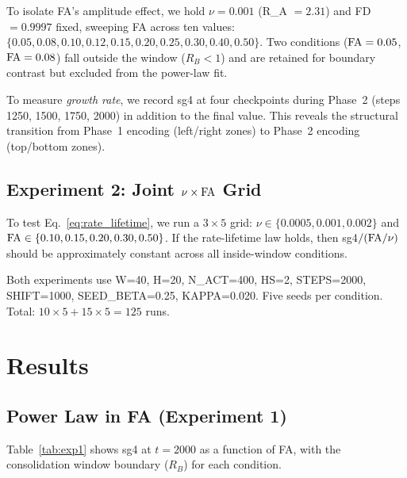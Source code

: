 \documentclass[11pt]{article}
\begin{document}
To isolate FA's amplitude effect, we hold $\nu = 0.001$ (R\_A $= 2.31$)
and FD $= 0.9997$ fixed, sweeping FA across ten values:
$\{0.05, 0.08, 0.10, 0.12, 0.15, 0.20, 0.25, 0.30, 0.40, 0.50\}$.
Two conditions (${\rm FA} = 0.05$, ${\rm FA} = 0.08$) fall outside the
window ($R_B < 1$) and are retained for boundary contrast but excluded from
the power-law fit.

To measure \emph{growth rate}, we record sg4 at four checkpoints during
Phase~2 (steps 1250, 1500, 1750, 2000) in addition to the final value.
This reveals the structural transition from Phase~1 encoding
(left/right zones) to Phase~2 encoding (top/bottom zones).

\subsection{Experiment 2: Joint $\nu \times {\rm FA}$ Grid}

To test Eq.~\eqref{eq:rate_lifetime}, we run a $3 \times 5$ grid:
$\nu \in \{0.0005, 0.001, 0.002\}$ and
${\rm FA} \in \{0.10, 0.15, 0.20, 0.30, 0.50\}$.
If the rate-lifetime law holds, then sg4$/({\rm FA}/\nu)$ should be
approximately constant across all inside-window conditions.

Both experiments use W=40, H=20, N\_ACT=400, HS=2, STEPS=2000, SHIFT=1000,
SEED\_BETA=0.25, KAPPA=0.020.
Five seeds per condition. Total: $10 \times 5 + 15 \times 5 = 125$ runs.

\section{Results}

\subsection{Power Law in FA (Experiment 1)}

Table~\ref{tab:exp1} shows sg4 at $t=2000$ as a function of FA, with
the consolidation window boundary ($R_B$) for each condition.
\end{document}
